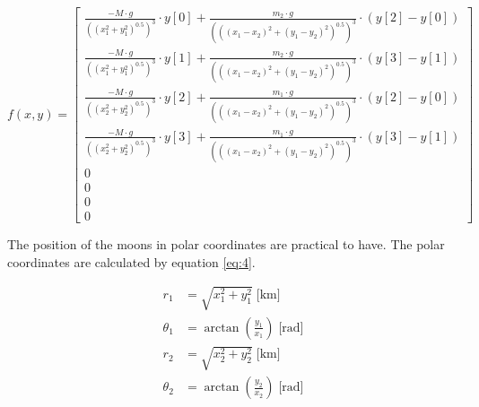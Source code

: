 \begin{equation}
f(x,y) = \left[ \begin{matrix} \frac { -M\cdot g }{ \left( \left( x_{ 1 }^{ 2 }+y_{ 1 }^{ 2 } \right) ^{ 0.5 } \right) ^{ 3 } } \cdot y\left[ 0 \right] +\frac { m_{ 2 }\cdot g }{ \left( \left( \left( x_{ 1 }-x_{ 2 } \right) ^{ 2 }+\left( y_{ 1 }-y_{ 2 } \right) ^{ 2 } \right) ^{ 0.5 } \right)^{ 3 }  } \cdot\left( y\left[ 2 \right] -y\left[ 0 \right]  \right)  \\ \frac { -M\cdot g }{ \left( \left( x_{ 1 }^{ 2 }+y_{ 1 }^{ 2 } \right) ^{ 0.5 } \right) ^{ 3 } } \cdot y\left[ 1 \right] +\frac { m_{ 2 }\cdot g }{ \left( \left( \left( x_{ 1 }-x_{ 2 } \right) ^{ 2 }+\left( y_{ 1 }-y_{ 2 } \right) ^{ 2 } \right) ^{ 0.5 } \right) ^{ 3 } } \cdot \left( y\left[ 3 \right] -y\left[ 1 \right]  \right)  \\ \frac { -M\cdot g }{ \left( \left( x_{ 2 }^{ 2 }+y_{ 2 }^{ 2 } \right) ^{ 0.5 } \right) ^{ 3 } } \cdot y\left[ 2 \right] +\frac { m_{ 1 }\cdot g }{ \left( \left( \left( x_{ 1 }-x_{ 2 } \right) ^{ 2 }+\left( y_{ 1 }-y_{ 2 } \right) ^{ 2 } \right) ^{ 0.5 } \right) ^{ 3 } } \cdot \left( y\left[ 2 \right] -y\left[ 0 \right]  \right)  \\ \frac { -M\cdot g }{ \left( \left( x_{ 2 }^{ 2 }+y_{ 2 }^{ 2 } \right) ^{ 0.5 } \right) ^{ 3 } } \cdot y\left[ 3 \right] +\frac { m_{ 1 }\cdot g }{ \left( \left( \left( x_{ 1 }-x_{ 2 } \right) ^{ 2 }+\left( y_{ 1 }-y_{ 2 } \right) ^{ 2 } \right) ^{ 0.5 } \right) ^{ 3 } } \cdot \left( y\left[ 3 \right] -y\left[ 1 \right]  \right)  \\ 0 \\ 0 \\ 0 \\ 0 \end{matrix} \right] 
\label{eq:6}
\end{equation}

The position of the moons in polar coordinates are practical to have. The polar coordinates are calculated by equation \ref{eq:4}.

\begin{equation}
\begin{align*}
r_{ 1 }&=\sqrt { x_{ 1 }^{ 2 }+y_{ 1 }^{ 2 } } \; \text{[km]} \\ 
\theta _{ 1 }&=\arctan { \left( \frac { y_1 }{ x_1 }  \right)  } \; \text{[rad]} \\ 
r_{ 2 }&=\sqrt { x_{ 2 }^{ 2 }+y_{ 2 }^{ 2 } } \; \text{[km]} \\ 
\theta _{ 2 }&=\arctan { \left( \frac { y_2 }{ x_2 }  \right)  } \; \text{[rad]} 
\end{align*}
\label{eq:4}
\end{equation}


